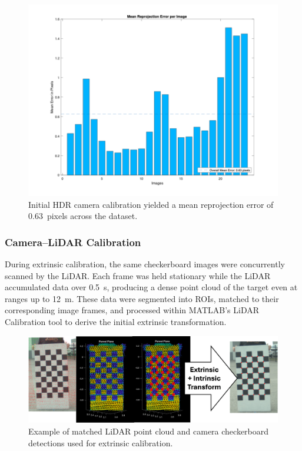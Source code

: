 \documentclass{erauthesis}
\begin{document}
\begin{figure}[htbp]
    \centering
    \includegraphics[width=0.75\linewidth]{Images/HDR_calib_error.png}
    \caption{Initial HDR camera calibration yielded a mean reprojection error of 0.63~pixels across the dataset.}
    \label{fig:HDR_calib_error}
\end{figure}


\subsubsection{Camera–LiDAR Calibration} \label{sec:camera-lidar_results}

During extrinsic calibration, the same checkerboard images were concurrently scanned by the LiDAR.  
Each frame was held stationary while the LiDAR accumulated data over 0.5~s, producing a dense point cloud of the target even at ranges up to 12~m.  
These data were segmented into \acp{ROI}, matched to their corresponding image frames, and processed within MATLAB’s LiDAR Calibration tool \cite{matlab_calibration} to derive the initial extrinsic transformation.

\begin{figure}[htbp]
    \centering
    \includegraphics[width=0.8\linewidth]{Images/calib_checkers.png}
    \caption{Example of matched LiDAR point cloud and camera checkerboard detections used for extrinsic calibration.}
    \label{fig:calib_check}
\end{figure}
\end{document}
